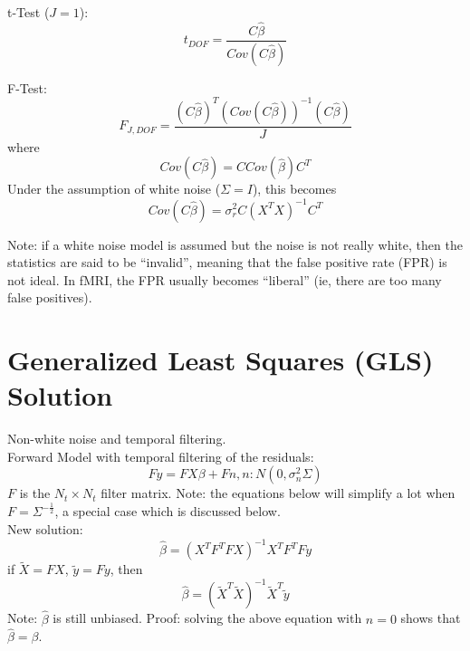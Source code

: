 \documentclass{article}
\begin{document}
\noindent
t-Test ($J=1$):
\begin{equation}
t_{DOF} = \frac{ C \hat\beta } { Cov(C \hat\beta) }
\end{equation}

\noindent
F-Test:
\begin{equation}
F_{J,DOF} = \frac{ (C\hat\beta)^T (Cov(C \hat\beta))^{-1} (C\hat\beta)}{J}
\end{equation}
where
\begin{equation}
Cov(C \hat\beta) = C Cov(\hat\beta) C^T
\end{equation}
Under the assumption of white noise ($\Sigma = I$), this becomes
\begin{equation}
Cov(C \hat\beta) = \sigma_r^2 C (X^TX)^{-1} C^T
\end{equation}

\noindent
Note: if a white noise model is assumed but the noise is not really
white, then the statistics are said to be ``invalid'', meaning that
the false positive rate (FPR) is not ideal. In fMRI, the FPR usually
becomes ``liberal'' (ie, there are too many false positives).

\section{Generalized Least Squares (GLS) Solution}

Non-white noise and temporal filtering.\\

\noindent
Forward Model with temporal filtering of the residuals:
\begin{equation}
Fy = FX \beta + Fn, n: N(0,\sigma_n^2 \Sigma)
\end{equation}
$F$ is the $N_t \times N_t$ filter matrix. Note: the equations
below will simplify a lot when $F = \Sigma^{-\frac{1}{2}}$, a special
case which is discussed below. \\

\noindent
New solution:
\begin{equation}
\hat{\beta} = (X^T F^T F X)^{-1}  X^T F^T  F y
\end{equation}
if $\tilde{X} = F X$, $\tilde{y} = F y$, then
\begin{equation}
\hat{\beta} = (\tilde{X}^T \tilde{X})^{-1}  \tilde{X}^T \tilde{y}
\end{equation}
Note: $\hat\beta$ is still unbiased. Proof: solving the above equation
with $n=0$ shows that $\hat\beta = \beta$.\\
\end{document}
